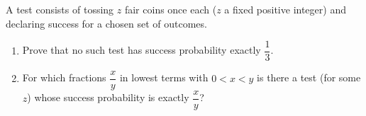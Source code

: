 A test consists of tossing $z$ fair coins once each ($z$ a fixed positive integer) and declaring success for a chosen set of outcomes.
\begin{enumerate}
\item[(a)] Prove that no such test has success probability exactly $\dfrac13$.
\item[(b)] For which fractions $\dfrac xy$ in lowest terms with $0<x<y$ is there a test (for some $z$) whose success probability is exactly $\dfrac xy$?
\end{enumerate}
